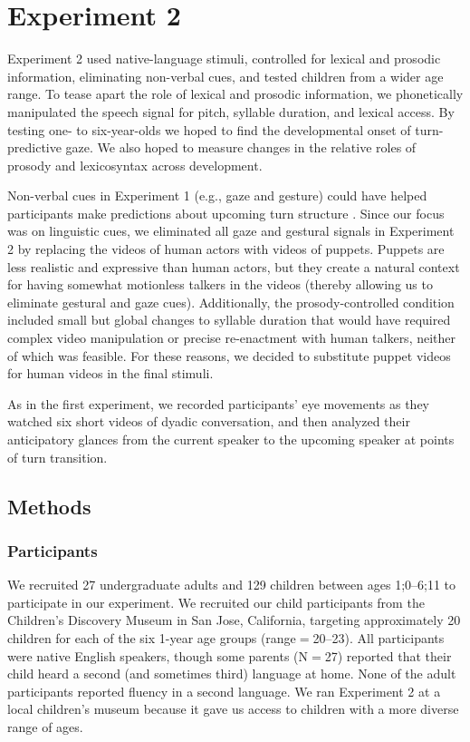 \documentclass[authoryear, 12pt]{elsarticle}
\begin{document}

%


\section{Experiment 2}
\label{sec:exp2}

Experiment 2 used native-language stimuli, controlled for lexical and prosodic information, eliminating non-verbal cues, and tested children from a wider age range. To tease apart the role of lexical and prosodic information, we phonetically manipulated the speech signal for pitch, syllable duration, and lexical access. By testing one- to six-year-olds we hoped to find the developmental onset of turn-predictive gaze. We also hoped to measure changes in the relative roles of prosody and lexicosyntax across development.

Non-verbal cues in Experiment 1 (e.g., gaze and gesture) could have helped participants make predictions about upcoming turn structure  \citep{rossano2009, stivers2010}. Since our focus was on linguistic cues, we eliminated all gaze and gestural signals in Experiment 2 by replacing the videos of human actors with videos of puppets. Puppets are less realistic and expressive than human actors, but they create a natural context for having somewhat motionless talkers in the videos (thereby allowing us to eliminate gestural and gaze cues). Additionally, the prosody-controlled condition included small but global changes to syllable duration that would have required complex video manipulation or precise re-enactment with human talkers, neither of which was feasible. For these reasons, we decided to substitute puppet videos for human videos in the final stimuli. 

As in the first experiment, we recorded participants' eye movements as they watched six short videos of dyadic conversation, and then analyzed their anticipatory glances from the current speaker to the upcoming speaker at points of turn transition.

\subsection{Methods}
\label{sec:methods2}

\subsubsection{Participants}
We recruited 27 undergraduate adults and 129 children between ages 1;0--6;11 to participate in our experiment. We recruited our child participants from the Children's Discovery Museum in San Jose, California, targeting approximately 20 children for each of the six 1-year age groups (range$=$20--23). All participants were native English speakers, though some parents (N$=$27) reported that their child heard a second (and sometimes third) language at home. None of the adult participants reported fluency in a second language. We ran Experiment 2 at a local children's museum because it gave us access to children with a more diverse range of ages.
\end{document}
